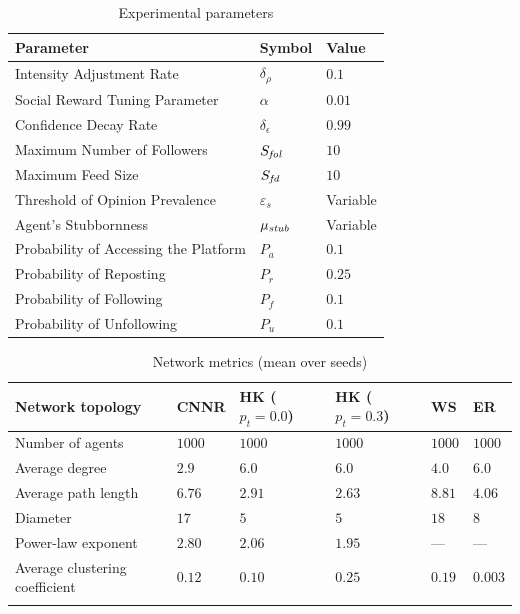 \documentclass[pdflatex,sn-mathphys-num]{sn-jnl}%
\theoremstyle{thmstyleone}%
\theoremstyle{thmstyletwo}%
\theoremstyle{thmstylethree}%
\def\post{\rho} %
\def\maxfollower{S_{\it fol}}
\def\maxfeed{S_{\it fd}}
\def\Stubbornness{\mu_{\it stub}}
\def\ThofOpPreval{\varepsilon_s}
\begin{document}
\begin{table}[t]
  \tabcolsep=5pt
  \centering
  \caption{Experimental parameters}\label{ExpParam}
  \begin{tabular}{lll}
    \toprule
    Parameter & Symbol & Value \\
    \midrule
    Intensity Adjustment Rate & $\delta_\post$ & $0.1$ \\
    Social Reward Tuning Parameter & $\alpha$ & $0.01$ \\
    Confidence Decay Rate & $\delta_\epsilon$ & $0.99$ \\
    Maximum Number of Followers & $\maxfollower$ & $10$\\
    Maximum Feed Size & $\maxfeed$ & $10$\\
    Threshold of Opinion Prevalence & $\ThofOpPreval$ & Variable\\
    Agent's Stubbornness & $\Stubbornness$ & Variable\\
    Probability of Accessing the Platform & $P_a$ & $0.1$\\
    Probability of Reposting & $P_r$ & $0.25$\\
    Probability of Following & $P_f$ & $0.1$\\
    Probability of Unfollowing & $P_u$ & $0.1$\\
    \bottomrule
  \end{tabular}
\end{table}

\begin{table}[t]
  \tabcolsep=5pt
  \centering
  \caption{Network metrics (mean over seeds)}\label{NWMetrics}
  \begin{tabular}{llllll}
    \toprule
    Network topology & CNNR & HK ($p_t{=}0.0$) & HK ($p_t{=}0.3$) & WS & ER \\
    \midrule
    Number of agents               & $1000$  & $1000$  & $1000$  & $1000$  & $1000$ \\
    Average degree                 & $2.9$   & $6.0$   & $6.0$   & $4.0$   & $6.0$  \\
    Average path length            & $6.76$  & $2.91$  & $2.63$  & $8.81$  & $4.06$ \\
    Diameter                       & $17$    & $5$     & $5$     & $18$    & $8$    \\
    Power-law exponent             & $2.80$  & $2.06$  & $1.95$  & ---     & ---    \\
    Average clustering coefficient & $0.12$  & $0.10$  & $0.25$  & $0.19$  & $0.003$ \\
    \bottomrule\\
  \end{tabular}
\end{table}
\end{document}
